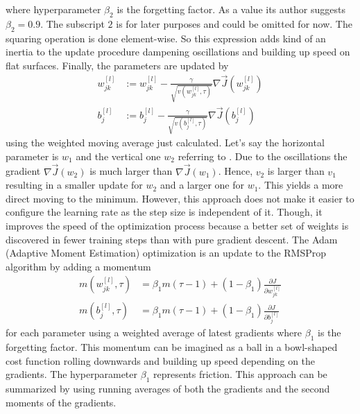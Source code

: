 where hyperparameter $\beta_2$ is the forgetting factor.
As a value its author suggests $\beta_2 = 0.9$.
The subscript $2$ is for later purposes and could be omitted for now.
The squaring operation is done element-wise.
So this expression adds kind of an inertia to the update procedure dampening oscillations and building up speed on flat surfaces.
Finally, the parameters are updated by
\begin{subequations}
	\begin{align}
		w^{[l]}_{jk} &:= w^{[l]}_{jk} - \frac{\gamma}{\sqrt{v(w^{[l]}_{jk}, \tau)}} \nabla \vec{J}(w^{[l]}_{jk}) \\
		b^{[l]}_{j} &:= b^{[l]}_{j} - \frac{\gamma}{\sqrt{v(b^{[l]}_{j}, \tau)}} \nabla \vec{J}(b^{[l]}_{j})
	\end{align}
\end{subequations}
using the weighted moving average just calculated.
Let's say the horizontal parameter is $w_1$ and the vertical one $w_2$ referring to .
Due to the oscillations the gradient $\nabla \vec{J}(w_2)$ is much larger than $\nabla \vec{J}(w_1)$.
Hence, $v_2$ is larger than $v_1$ resulting in a smaller update for $w_2$ and a larger one for $w_1$.
This yields a more direct moving to the minimum.
However, this approach does not make it easier to configure the learning rate as the step size is independent of it.
Though, it improves the speed of the optimization process because a better set of weights is discovered in fewer training steps than with pure gradient descent.
The Adam (Adaptive Moment Estimation) optimization is an update to the RMSProp algorithm by adding a momentum
\begin{subequations}
	\label{eq:adam-first-momentum}
	\begin{align}
		m(w^{[l]}_{jk},\tau) &= \beta_1 m(\tau -1) + (1- \beta_1) \frac{\partial J}{\partial w^{[l]}_{jk}} \\
		m(b^{[l]}_{j},\tau) &= \beta_1 m(\tau -1) + (1- \beta_1) \frac{\partial J}{\partial b^{[l]}_{j}}
	\end{align}
\end{subequations}
for each parameter using a weighted average of latest gradients\cite{DBLP:journals/corr/KingmaB14} where $\beta_1$ is the forgetting factor.
This momentum can be imagined as a ball in a bowl-shaped cost function rolling downwards and building up speed depending on the gradients.
The hyperparameter $\beta_1$ represents friction.
This approach can be summarized by using running averages of both the gradients and the second moments of the gradients.
